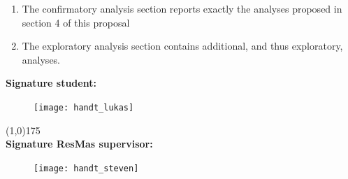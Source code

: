 \documentclass[12pt,a4paper]{article}\usepackage[]{graphicx}\usepackage[]{color}
\begin{document}
\begin{enumerate}
\item The confirmatory analysis section reports exactly the analyses proposed in section 4 of this proposal
\item The exploratory analysis section contains additional, and thus exploratory, analyses. 
\end{enumerate}

\noindent
\textbf{Signature student:} 

\begin{figure}[h]
\texttt{[image: handt\_lukas]}
\end{figure}

\noindent
\line(1,0){175} \\


\noindent
\textbf{Signature ResMas supervisor:}

\begin{figure}[h]
\texttt{[image: handt\_steven]}
\end{figure}


%
\end{document}
